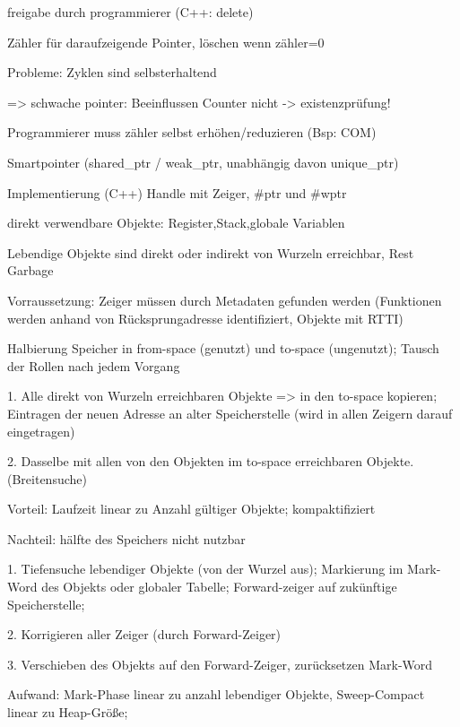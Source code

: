 freigabe durch programmierer (C++: delete)

Zähler für daraufzeigende Pointer, löschen wenn zähler=0

Probleme: Zyklen sind selbsterhaltend 

=> schwache pointer: Beeinflussen Counter nicht -> existenzprüfung!

 Programmierer muss zähler selbst erhöhen/reduzieren (Bsp: COM)

 Smartpointer (shared\_ptr / weak\_ptr, unabhängig davon unique\_ptr)

Implementierung (C++) Handle mit Zeiger, \#ptr und \#wptr

 direkt verwendbare Objekte: Register,Stack,globale Variablen

Lebendige Objekte sind direkt oder indirekt von Wurzeln erreichbar, Rest Garbage

Vorraussetzung: Zeiger müssen durch Metadaten gefunden werden (Funktionen werden anhand von Rücksprungadresse identifiziert, Objekte mit RTTI)

Halbierung Speicher in from-space (genutzt) und to-space (ungenutzt);
Tausch der Rollen nach jedem Vorgang

1. Alle direkt von Wurzeln erreichbaren Objekte => in den to-space kopieren; Eintragen der neuen Adresse an alter Speicherstelle (wird in allen Zeigern darauf eingetragen)

2. Dasselbe mit allen von den Objekten im to-space erreichbaren Objekte. (Breitensuche)

Vorteil: Laufzeit linear zu Anzahl gültiger Objekte; kompaktifiziert

Nachteil: hälfte des Speichers nicht nutzbar


1. Tiefensuche lebendiger Objekte (von der Wurzel aus); Markierung im Mark-Word des Objekts oder globaler Tabelle; Forward-zeiger auf zukünftige Speicherstelle;

2. Korrigieren aller Zeiger (durch Forward-Zeiger)

3. Verschieben des Objekts auf den Forward-Zeiger, zurücksetzen Mark-Word 

Aufwand: Mark-Phase linear zu anzahl lebendiger Objekte, Sweep-Compact linear zu Heap-Größe;


